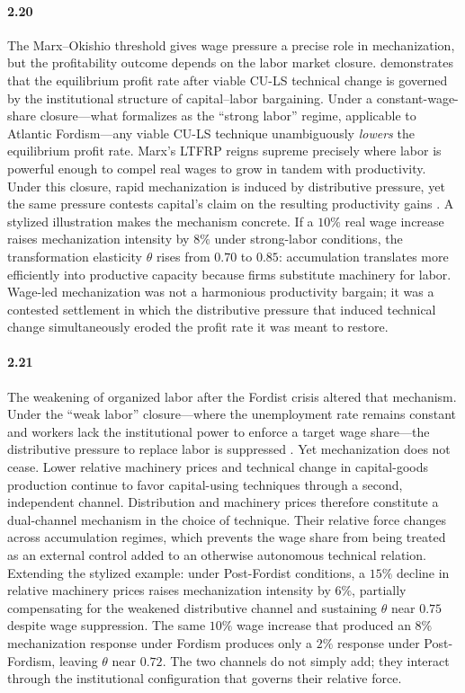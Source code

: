 \paragraph{2.20}
The Marx--Okishio threshold gives wage pressure a precise role
in mechanization, but the profitability outcome depends on the
labor market closure. \citet{Basu2026} demonstrates that the
equilibrium profit rate after viable CU-LS technical change is
governed by the institutional structure of capital--labor
bargaining. Under a constant-wage-share closure---what
\citet{Basu2026} formalizes as the ``strong labor'' regime,
applicable to Atlantic Fordism---any viable CU-LS technique
unambiguously \textit{lowers} the equilibrium profit rate.
Marx's LTFRP reigns supreme precisely where labor is powerful
enough to compel real wages to grow in tandem with productivity.
Under this closure, rapid mechanization is induced by
distributive pressure, yet the same pressure contests capital's
claim on the resulting productivity gains
\citep{Vidal2015, Vidal2019}. A stylized illustration makes the
mechanism concrete. If a $10\%$ real wage increase raises
mechanization intensity by $8\%$ under strong-labor conditions,
the transformation elasticity $\theta$ rises from $0.70$ to
$0.85$: accumulation translates more efficiently into productive
capacity because firms substitute machinery for labor. Wage-led
mechanization was not a harmonious productivity bargain; it was
a contested settlement in which the distributive pressure that
induced technical change simultaneously eroded the profit rate
it was meant to restore.

\paragraph{2.21}
The weakening of organized labor after the Fordist crisis
altered that mechanism. Under the ``weak labor'' closure---where
the unemployment rate remains constant and workers lack the
institutional power to enforce a target wage share---the
distributive pressure to replace labor is suppressed
\citep{Basu2026}. Yet mechanization does not cease. Lower
relative machinery prices and technical change in capital-goods
production continue to favor capital-using techniques through a
second, independent channel. Distribution and machinery prices
therefore constitute a dual-channel mechanism in the
choice of technique. Their relative force changes across
accumulation regimes, which prevents the wage share from being
treated as an external control added to an otherwise autonomous
technical relation. Extending the stylized example: under
Post-Fordist conditions, a $15\%$ decline in relative machinery
prices raises mechanization intensity by $6\%$, partially
compensating for the weakened distributive channel and
sustaining $\theta$ near $0.75$ despite wage suppression. The
same $10\%$ wage increase that produced an $8\%$ mechanization
response under Fordism produces only a $2\%$ response under
Post-Fordism, leaving $\theta$ near $0.72$. The two channels do
not simply add; they interact through the institutional
configuration that governs their relative force.

